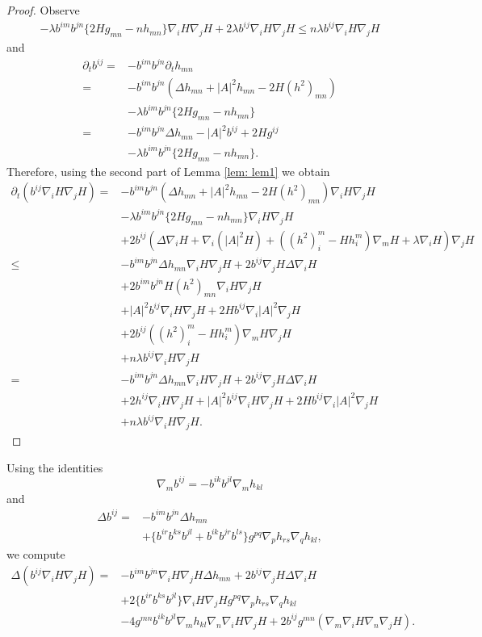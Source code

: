 \documentclass{amsart}
\theoremstyle{definition}
\theoremstyle{remark}
\numberwithin{equation}{section}
\begin{document}
\begin{proof}
Observe
\begin{align*}
-\lambda b^{im}b^{jn}\{2Hg_{mn}-nh_{mn}\}\nabla_iH\nabla_jH+2\lambda b^{ij}\nabla_iH\nabla_jH\leq n\lambda b^{ij}\nabla_iH\nabla_jH
\end{align*}
and
\begin{align*}
\partial_t b^{ij}=&-b^{im}b^{jn}\partial_th_{mn}\\
=&-b^{im}b^{jn}(\Delta h_{mn}+|A|^2h_{mn}-2H(h^2)_{mn})\\
&-\lambda b^{im}b^{jn}\{2Hg_{mn}-nh_{mn}\}\\
=&-b^{im}b^{jn}\Delta h_{mn}-|A|^2b^{ij}+2Hg^{ij}\\
&-\lambda b^{im}b^{jn}\{2Hg_{mn}-nh_{mn}\}.
\end{align*}
Therefore, using the second part of Lemma \ref{lem: lem1} we obtain
\begin{align*}
\partial_t( b^{ij}\nabla_iH\nabla_jH)=&-b^{im}b^{jn}(\Delta h_{mn}+|A|^2h_{mn}-2H(h^2)_{mn})\nabla_iH\nabla_jH\\
&-\lambda b^{im}b^{jn}\{2Hg_{mn}-nh_{mn}\}\nabla_iH\nabla_jH\\
&+2b^{ij}(\Delta\nabla_iH+\nabla_i(|A|^2H)+((h^2)_i^m-Hh_i^m)\nabla_mH+\lambda \nabla_iH)\nabla_jH\\
\leq& -b^{im}b^{jn}\Delta h_{mn}\nabla_iH\nabla_jH+2b^{ij}\nabla_jH\Delta\nabla_iH\\
&+2b^{im}b^{jn}H(h^2)_{mn}\nabla_iH\nabla_jH\\
&+|A|^2b^{ij}\nabla_iH\nabla_jH+2Hb^{ij}\nabla_i|A|^2\nabla_jH\\
&+2b^{ij}((h^2)_i^m-Hh_i^m)\nabla_mH\nabla_jH\\
&+n\lambda b^{ij}\nabla_iH\nabla_jH\\
=&-b^{im}b^{jn}\Delta h_{mn}\nabla_iH\nabla_jH+2b^{ij}\nabla_jH\Delta\nabla_iH\\
&+2h^{ij}\nabla_iH\nabla_jH
+|A|^2b^{ij}\nabla_iH\nabla_jH+2Hb^{ij}\nabla_i|A|^2\nabla_jH\\
&+n\lambda b^{ij}\nabla_iH\nabla_jH.
\end{align*}
\end{proof}
Using the identities
\[\nabla_mb^{ij}=-b^{ik}b^{jl}\nabla_mh_{kl}\]
and
\begin{align*}
\Delta b^{ij}=&-b^{im}b^{jn}\Delta h_{mn}\\
&+\{b^{ir}b^{ks}b^{jl}+b^{ik}b^{jr}b^{ls}\}g^{pq}\nabla_ph_{rs}\nabla_qh_{kl},
\end{align*}
we compute
\begin{align*}
\Delta( b^{ij}\nabla_iH\nabla_jH)=&-b^{im}b^{jn}\nabla_iH\nabla_jH\Delta h_{mn}+2b^{ij}\nabla_jH\Delta\nabla_iH\\\
&+2\{b^{ir}b^{ks}b^{jl}\}\nabla_iH\nabla_jHg^{pq}\nabla_ph_{rs}\nabla_qh_{kl}\\
&-4g^{mn}b^{ik}b^{jl}\nabla_mh_{kl}\nabla_n\nabla_iH\nabla_jH+2b^{ij}g^{mn}(\nabla_m\nabla_iH\nabla_n\nabla_jH).
\end{align*}
\end{document}
